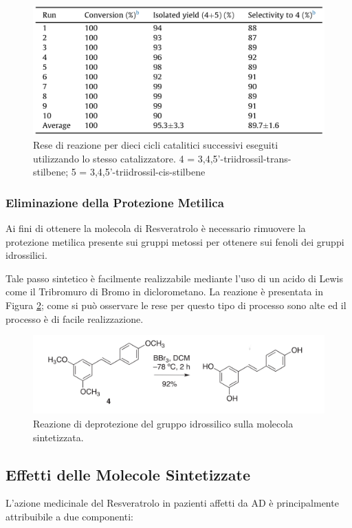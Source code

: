 \documentclass[a4paper, 12pt]{article}
\begin{document}
\begin{figure}[H]
	\centering
	\includegraphics[width=\linewidth]{immagini/perc_cata_resv.png}
	\caption{Rese di reazione per dieci cicli catalitici successivi eseguiti utilizzando lo stesso catalizzatore. 4 = 3,4,5'-triidrossil-trans-stilbene; 5 = 3,4,5'-triidrossil-cis-stilbene}
	\label{fig:perc_cata_resv}
\end{figure}

\subsubsection{Eliminazione della Protezione Metilica}
Ai fini di ottenere la molecola di Resveratrolo è necessario rimuovere la protezione metilica presente sui gruppi metossi per ottenere sui fenoli dei gruppi idrossilici.

Tale passo sintetico è facilmente realizzabile mediante l'uso di un acido di Lewis come il Tribromuro di Bromo in diclorometano. La reazione è presentata in Figura \ref{fig:deprot_resveratrolo}; come si può osservare le rese per questo tipo di processo sono alte ed il processo è di facile realizzazione. \cite{alejandro_v._martinez_expedient_2017}

\begin{figure}[H]
	\centering
	\includegraphics[width=\linewidth]{immagini/deprot_resveratrolo.png}
	\caption{Reazione di deprotezione del gruppo idrossilico sulla molecola sintetizzata.}
	\label{fig:deprot_resveratrolo}
\end{figure}

\subsection{Effetti delle Molecole Sintetizzate}
\label{effetti_resveratrolo}
L'azione medicinale del Resveratrolo in pazienti affetti da AD è principalmente attribuibile a due componenti:
\end{document}
